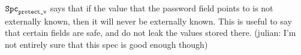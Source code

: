 ${\texttt{Spc}}_{{\texttt{protect\_v}}}$ says that if the value that the password field points to is not externally known, then it will never be externally known. This is useful to say that certain fields are safe, and do not leak the values stored there. (julian: I'm not entirely sure that this spec is good enough though)
 